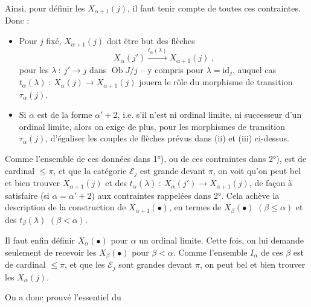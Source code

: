 \documentclass[11pt]{article}
\newcommand{\printedpage}[1]{\marginpar{\footnotesize p.~#1}}
\newcommand{\msp}[1]{\marginpar{\footnotesize [#1]}}
\newcommand{\Ob}{\operatorname{Ob}}
\begin{document}
\msp{257}
Ainsi, pour définir les $X_{\alpha+1}(j)$, il faut tenir compte de toutes ces contraintes. Donc :
\begin{itemize}[leftmargin=3em]
\item[1°)] Pour $j$ fixé, $X_{\alpha+1}(j)$ doit être but des flèches
\[
X_\alpha(j') \xrightarrow{t_\alpha(\lambda)} X_{\alpha+1}(j)\ ,
\]
pour les $\lambda\ :\ j'\longrightarrow j$ dans $\Ob J/j$ -- y compris pour $\lambda=\mathrm{id}_j$, auquel cas $t_\alpha(\lambda)\ :\ X_\alpha(j)\longrightarrow X_{\alpha+1}(j)$ jouera le rôle du morphisme de transition $\tau_\alpha(j)$.
\item[2°)] Si $\alpha$ est de la forme $\alpha'+2$, i.e. s'il n'est ni ordinal limite, ni successeur d'un ordinal limite, alors on exige de plus, pour les morphismes de transition $\tau_\alpha(j)$, d'égaliser les couples de flèches prévus dans (ii) et (iii) ci-dessus.
\end{itemize}
Comme l'ensemble de ces données dans 1°), ou de ces contraintes dans 2°),
\msp{258}
est de cardinal $\leqslant\pi$, et que la catégorie $\mathcal{E}_j$ est grande devant $\pi$, on voit qu'on peut bel et bien trouver $X_{\alpha+1}(j)$ et des $t_\alpha(\lambda)\ :\ X_\alpha(j')\longrightarrow X_{\alpha+1}(j)$, de façon à satisfaire (si $\alpha=\alpha'{+}2$) aux contraintes rappelées dans 2°. Cela achève la description de la construction de $X_{\alpha+1}(\bullet)$, en termes de $X_\beta(\bullet)$ $(\beta\leqslant\alpha)$ et des $t_\beta(\lambda)$ $(\beta<\alpha)$.

Il faut enfin définir $X_\alpha(\bullet)$ pour $\alpha$ un ordinal limite. Cette fois, on lui demande seulement de recevoir les $X_\beta(\bullet)$ pour $\beta<\alpha$. Comme l'ensemble $I_\alpha$ de ces $\beta$ est de cardinal $\leqslant\pi$, et que les $\mathcal{E}_j$ sont grandes devant $\pi$, on peut bel et bien trouver les $X_\alpha(j)$.

\printedpage{98}
\msp{259}
On a donc prouvé l'essentiel du
\end{document}
